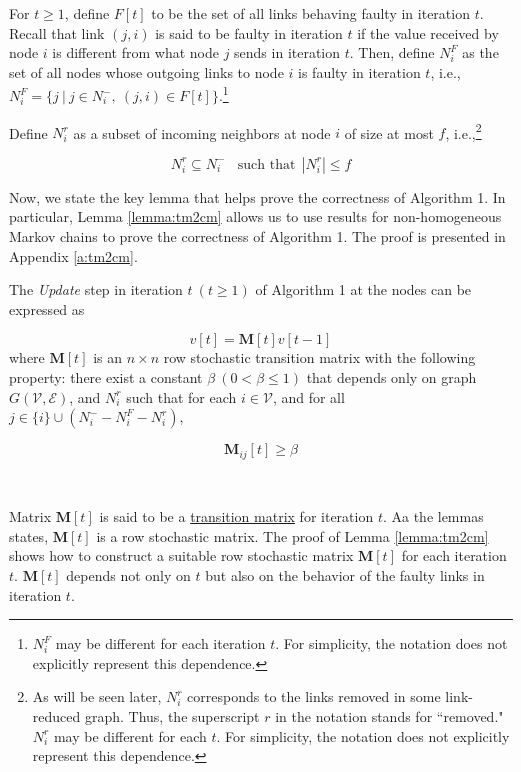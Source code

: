 \documentclass{llncs}
\newcommand{\scripte}{\mathcal{E}}
\newcommand{\scriptv}{\mathcal{V}}
\newcommand{\matrixm}{\textbf{M}}
\begin{document}
For $t \geq 1$, define $F[t]$ to be the set of all links behaving faulty in iteration $t$. Recall that link $(j,i)$ is said to be faulty in iteration $t$ if the value received by node $i$ is different from what node $j$ sends in iteration $t$. Then, define $N_i^F$ as the set of all nodes whose outgoing links to node $i$ is faulty in iteration $t$, i.e., $N_i^F = \{j~|~j \in N_i^-,~(j,i) \in F[t]\}$.\footnote{$N_i^F$ may be different for each iteration $t$. For simplicity, the notation does not explicitly represent this dependence.}


Define $N_i^r$ as a subset of incoming neighbors at node $i$ of size at most $f$, i.e.,\footnote{As will be seen later, $N_i^r$ corresponds to the links removed in some link-reduced graph. Thus, the superscript $r$ in the notation stands for ``removed." $N_i^r$ may be different for each $t$. For simplicity, the notation does not explicitly represent this dependence.}

\[
N_i^r \subseteq N_i^-~~~~\text{such that}~~|N_i^r| \leq f
\]

Now, we state the key lemma that helps prove the correctness of Algorithm 1. In particular, Lemma \ref{lemma:tm2cm} allows us to use results for non-homogeneous Markov chains to prove the correctness of Algorithm 1.  The proof is presented in Appendix \ref{a:tm2cm}.



\begin{lemma}
\label{lemma:tm2cm}
The {\em Update} step in iteration $t~(t \geq 1)$ of Algorithm 1 at the nodes can be expressed as 

\begin{equation}
\label{matrix:e_T}
v[t] = \matrixm[t] v[t-1]
\end{equation}
where {\normalfont$\matrixm[t]$} is an $n \times n$ row stochastic transition matrix with the following property: there exist a constant $\beta~(0 < \beta \leq 1)$ that depends only on graph $G(\scriptv, \scripte)$, and $N_i^r$ such that for each $i \in \scriptv$, and  for all $j \in \{i\}\cup(N_i^- - N_i^F - N_i^r)$, 

\[
\matrixm_{ij}[t] \geq \beta
\]
\end{lemma}

~

Matrix $\matrixm[t]$ is said to be a \underline{transition matrix} for iteration $t$. Aa the lemmas states, $\matrixm[t]$ is a row stochastic matrix. The proof of Lemma \ref{lemma:tm2cm} shows how to construct a suitable row stochastic matrix $\matrixm[t]$ for each iteration $t$. $\matrixm[t]$ depends not only on $t$ but also on the behavior of the faulty links in iteration $t$. 
\end{document}
